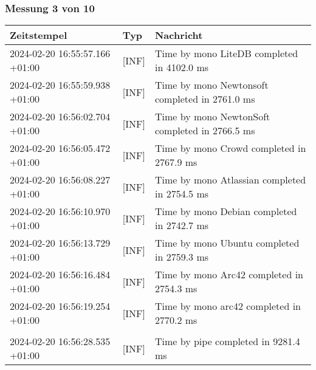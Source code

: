     \subsubsection*{Messung 3 von 10} \label{subsubsec:LiteDbWenigerPaketeAlsDb3von10}
        {
            {\small
                \begin{tabularx}{\textwidth}{|l|l|X|}
                    \hline
                    \textbf{Zeitstempel} & \textbf{Typ} & \textbf{Nachricht} \\
                    \hline
                    \endhead
                    2024-02-20 16:55:57.166 +01:00 & [INF] & Time by mono LiteDB completed in 4102.0 ms \\
                    2024-02-20 16:55:59.938 +01:00 & [INF] & Time by mono Newtonsoft completed in 2761.0 ms \\
                    2024-02-20 16:56:02.704 +01:00 & [INF] & Time by mono NewtonSoft completed in 2766.5 ms \\
                    2024-02-20 16:56:05.472 +01:00 & [INF] & Time by mono Crowd completed in 2767.9 ms \\
                    2024-02-20 16:56:08.227 +01:00 & [INF] & Time by mono Atlassian completed in 2754.5 ms \\
                    2024-02-20 16:56:10.970 +01:00 & [INF] & Time by mono Debian completed in 2742.7 ms \\
                    2024-02-20 16:56:13.729 +01:00 & [INF] & Time by mono Ubuntu completed in 2759.3 ms \\
                    2024-02-20 16:56:16.484 +01:00 & [INF] & Time by mono Arc42 completed in 2754.3 ms \\
                    2024-02-20 16:56:19.254 +01:00 & [INF] & Time by mono arc42 completed in 2770.2 ms \\
                    & & \\
                    2024-02-20 16:56:28.535 +01:00 & [INF] & Time by pipe completed in 9281.4 ms \\
                    \hline
                \end{tabularx}
            }
        }


